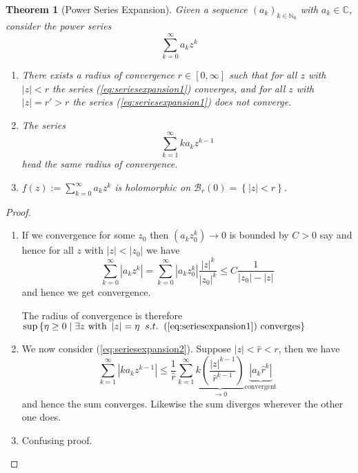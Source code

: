 \documentclass[11pt]{article}
\newcommand{\defeq}{:=}
\newcommand{\abs}[1]{\left|#1\right|}
\newcommand{\relmiddle}[1]{\mathrel{}\middle#1\mathrel{}}
\newcommand{\rmv}{\relmiddle|}
\newcommand{\C}{\mathbb{C}}
\newcommand{\N}{\mathbb{N}}
\newcommand{\mdf}[1]{{\color{red} #1}}
\newtheorem{theorem}{Theorem}[section]
\begin{document}
\begin{theorem}[Power Series Expansion]
Given a sequence $(a_k)_{k\in\N_0}$ with $a_k\in\C$, consider the power series
\begin{equation}
	\sum_{k=0}^{\infty}a_k z^k	
	\label{eq:seriesexpansion1}
\end{equation}
\begin{enumerate}[label=(\alph*)]
	\item There exists a \mdf{radius of convergence} $r\in [0,\infty]$ such that for all $z$ with $\abs{z}<r$ the series (\ref{eq:seriesexpansion1}) converges, and for all $z$ with $\abs{z}=r' > r$ the series (\ref{eq:seriesexpansion1}) does not converge.
	\item The series
		\begin{equation}
			\sum_{k=1}^{\infty}k a_k z^{k-1}
			\label{eq:seriesexpansion2}
		\end{equation}
		head the same radius of convergence.
	\item $f(z)\defeq\sum_{k=0}^{\infty}a_k z^k$ is holomorphic on $\mathcal{B}_r(0)=\left\{\abs{z}< r\right\}$.
\end{enumerate}
\end{theorem}

\begin{proof}
\begin{enumerate}[label=(\alph*)]
	\item If we convergence for some $z_0$ then $(a_kz_0^k)\to 0$ is bounded by $C>0$ say and hence for all $z$ with $\abs{z}<\abs{z_0}$ we have
		\[
			\sum_{k=0}^{\infty}\abs{a_kz^k}=\sum_{k=0}^{\infty}\abs{a_k z_0^k}\frac{\abs{z}^k}{\abs{z_0}^k}\leq C \frac{1}{\abs{z_0}-\abs{z}}
		\]
		and hence we get convergence.
		
		The radius of convergence is therefore $\sup\left\{\eta \geq 0 \rmv \exists z \text{ with }\abs{z}=\eta \;\; s.t. \;\; (\ref{eq:seriesexpansion1}) \text{ converges}\right\}$
	\item We now consider (\ref{eq:seriesexpansion2}).
		Suppose $\abs{z}<\hat{r} < r$, then we have
		\[
			\sum_{k=1}^{\infty}\abs{ka_k z^{k-1}} \leq \frac{1}{\hat{r}}\sum_{k=1}^{\infty}\underbrace{k\left(\frac{\abs{z}^{k-1}}{\hat{r}^{k-1}}\right)}_{\to 0}\underbrace{\abs{a_k\hat{r}^k}}_{\text{convergent}}
		\]
		and hence the sum converges.
		Likewise the sum diverges wherever the other one does.
	\item Confusing proof.
\end{enumerate}
\end{proof}
\end{document}
